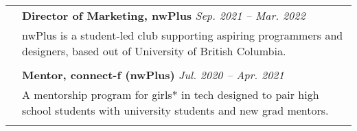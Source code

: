\documentclass[letterpaper, 11pt]{article}
\begin{document}
\begin{longtable}{p{1.3in}p{4.8in}}
	 & \textbf{Director of Marketing, nwPlus} \hfill \textit{Sep. 2021 -- Mar. 2022}                                                                                                                                                                                                                                                                                                             \\
	 & nwPlus is a student-led club supporting aspiring programmers and designers, based out of University of British Columbia.                                                                                                                                                                                                                                                                  \\
	 &                                                                                                                                                                                                                                                                                                                                                                                           \\

	 & \textbf{Mentor, connect-f (nwPlus)} \hfill \textit{Jul. 2020 -- Apr. 2021}                                                                                                                                                                                                                                                                                                                \\
	 & A mentorship program for girls* in tech designed to pair high school students with university students and new grad mentors.                                                                                                                                                                                                                                                              \\
	 &                                                                                                                                                                                                                                                                                                                                                                                           \\


\end{longtable}
\end{document}
